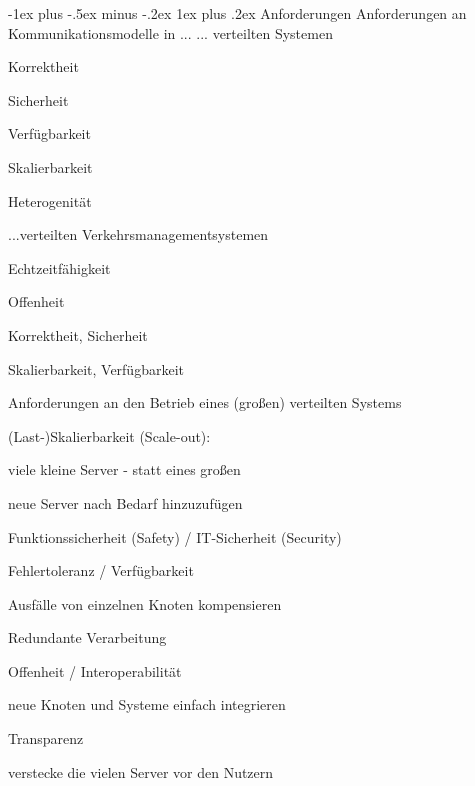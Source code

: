 \documentclass[10pt]{article}
\makeatletter
\renewcommand{\subsubsection}{\@startsection{subsubsection}{3}{0mm}%
                                {-1ex plus -.5ex minus -.2ex}%
                                {1ex plus .2ex}%
                                {\normalfont\small\bfseries}}
\makeatother
\begin{document}
  \subsubsection{Anforderungen}
  \color{orange} Anforderungen an Kommunikationsmodelle in ... \color{black}
  \newline
  ... verteilten Systemen\newline \newline
  \begin{itemize*}
    \item Korrektheit
    \item Sicherheit
    \item Verfügbarkeit
    \item Skalierbarkeit
    \item Heterogenität
  \end{itemize*}
  
  ...verteilten Verkehrsmanagementsystemen\newline \newline
  \begin{itemize*}
    \item Echtzeitfähigkeit
    \item Offenheit
    \item Korrektheit, \newline Sicherheit
    \item Skalierbarkeit, \newline Verfügbarkeit
  \end{itemize*}
  
  \color{orange} Anforderungen \color{black} an den Betrieb eines (großen) verteilten Systems
  \begin{itemize*}
    \item (Last-)Skalierbarkeit (Scale-out):
    \begin{itemize*}
      \item viele kleine Server - statt eines großen
      \item neue Server nach Bedarf hinzuzufügen
    \end{itemize*}
    \item Funktionssicherheit (Safety) / IT-Sicherheit (Security)
    \item Fehlertoleranz / Verfügbarkeit
    \begin{itemize*}
      \item Ausfälle von einzelnen Knoten kompensieren
      \item Redundante Verarbeitung
    \end{itemize*}
    \item Offenheit / Interoperabilität
    \begin{itemize*}
      \item neue Knoten und Systeme einfach integrieren
    \end{itemize*}
    \item Transparenz
    \begin{itemize*}
      \item verstecke die vielen Server vor den Nutzern
    \end{itemize*}
  \end{itemize*}
  
\end{document}
